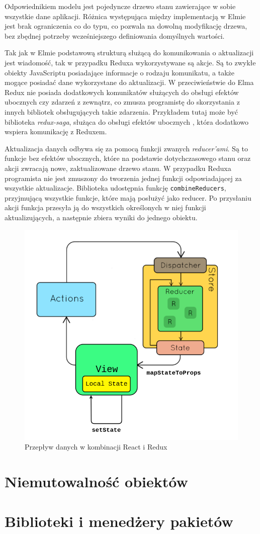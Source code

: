 Odpowiednikiem modelu jest pojedyncze drzewo stanu zawierające w sobie wszystkie dane aplikacji. Różnica występująca między implementacją w Elmie jest brak ograniczenia co do typu, co pozwala na dowolną modyfikację drzewa, bez zbędnej potrzeby wcześniejszego definiowania domyślnych wartości. 

Tak jak w Elmie podstawową strukturą służącą do komunikowania o aktualizacji jest wiadomość, tak w przypadku Reduxa wykorzystywane są akcje. Są to zwykłe obiekty JavaScriptu posiadające informacje o rodzaju komunikatu, a także mogące posiadać dane wykorzystane do aktualizacji. W przeciwieństwie do Elma Redux nie posiada dodatkowych komunikatów służących do obsługi efektów ubocznych czy zdarzeń z zewnątrz, co zmusza programistę do skorzystania z innych bibliotek obsługujących takie zdarzenia. Przykładem tutaj może być biblioteka \textit{redux-saga}, służąca do obsługi efektów ubocznych \cite{reduxSaga}, która dodatkowo wspiera komunikację z Reduxem.

Aktualizacja danych odbywa się za pomocą funkcji zwanych \textit{reducer'ami}. Są to funkcje bez efektów ubocznych, które na podstawie dotychczasowego stanu oraz akcji zwracają nowe, zaktualizowane drzewo stanu. W przypadku Reduxa programista nie jest zmuszony do tworzenia jednej funkcji odpowiadającej za wszystkie aktualizacje. Biblioteka udostępnia funkcję \lstinline{combineReducers}, przyjmującą wszystkie funkcje, które mają posłużyć jako reducer. Po przysłaniu akcji funkcja przesyła ją do wszystkich określonych w niej funkcji aktualizujących, a następnie zbiera wyniki do jednego obiektu.
\begin{figure}[h]
	\centering
	\includegraphics[height=0.38\textheight]{images/react_redux_data_flow}
	\caption{Przepływ danych w kombinacji React i Redux}
	\label{fig:reactReduxFlow}
\end{figure}
\FloatBarrier


\section{Niemutowalność obiektów}

\section{Biblioteki i menedżery pakietów}

